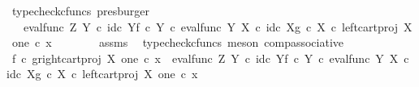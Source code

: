 \begin{isabellebody}
\ {\isacharparenleft}{\kern0pt}typecheck{\isacharunderscore}{\kern0pt}cfuncs{\isacharcomma}{\kern0pt}\ presburger{\isacharparenright}{\kern0pt}\isanewline
\ \ \ \ \isamarkupfalse%
\ \isamarkupfalse%
\ {\isachardoublequoteopen}{\isachardot}{\kern0pt}{\isachardot}{\kern0pt}{\isachardot}{\kern0pt}\ {\isacharequal}{\kern0pt}\ {\isacharparenleft}{\kern0pt}{\isacharparenleft}{\kern0pt}{\isacharparenleft}{\kern0pt}eval{\isacharunderscore}{\kern0pt}func\ Z\ Y\ {\isasymcirc}\isactrlsub c\ {\isasymlangle}id\isactrlsub c\ Y{\isacharcomma}{\kern0pt}f\ {\isasymcirc}\isactrlsub c\ {\isasymbeta}\isactrlbsub Y\isactrlesub {\isasymrangle}{\isacharparenright}{\kern0pt}\ {\isasymcirc}\isactrlsub c\ eval{\isacharunderscore}{\kern0pt}func\ Y\ X\ {\isasymcirc}\isactrlsub c\ {\isasymlangle}id\isactrlsub c\ X{\isacharcomma}{\kern0pt}g\ {\isasymcirc}\isactrlsub c\ {\isasymbeta}\isactrlbsub X\isactrlesub {\isasymrangle}{\isacharparenright}{\kern0pt}\ {\isasymcirc}\isactrlsub c\ left{\isacharunderscore}{\kern0pt}cart{\isacharunderscore}{\kern0pt}proj\ X\ one{\isacharparenright}{\kern0pt}\ {\isasymcirc}\isactrlsub c\ x{}{\isachardoublequoteclose}\isanewline
\ \ \ \ \ \ \isamarkupfalse%
\ assms\ \isamarkupfalse%
\ {\isacharparenleft}{\kern0pt}typecheck{\isacharunderscore}{\kern0pt}cfuncs{\isacharcomma}{\kern0pt}\ meson\ comp{\isacharunderscore}{\kern0pt}associative{}{\isacharparenright}{\kern0pt}\isanewline
\ \ \ \ \isamarkupfalse%
\ \isamarkupfalse%
\ {\isachardoublequoteopen}{\isacharparenleft}{\kern0pt}f\isactrlsup {\isasymflat}\ {\isasymcirc}\isactrlsub c\ {\isasymlangle}g\isactrlsup {\isasymflat}{\isacharcomma}{\kern0pt}right{\isacharunderscore}{\kern0pt}cart{\isacharunderscore}{\kern0pt}proj\ X\ one{\isasymrangle}{\isacharparenright}{\kern0pt}\ {\isasymcirc}\isactrlsub c\ x{}\ {\isacharequal}{\kern0pt}\ {\isacharparenleft}{\kern0pt}{\isacharparenleft}{\kern0pt}{\isacharparenleft}{\kern0pt}eval{\isacharunderscore}{\kern0pt}func\ Z\ Y\ {\isasymcirc}\isactrlsub c\ {\isasymlangle}id\isactrlsub c\ Y{\isacharcomma}{\kern0pt}f\ {\isasymcirc}\isactrlsub c\ {\isasymbeta}\isactrlbsub Y\isactrlesub {\isasymrangle}{\isacharparenright}{\kern0pt}\ {\isasymcirc}\isactrlsub c\ eval{\isacharunderscore}{\kern0pt}func\ Y\ X\ {\isasymcirc}\isactrlsub c\ {\isasymlangle}id\isactrlsub c\ X{\isacharcomma}{\kern0pt}g\ {\isasymcirc}\isactrlsub c\ {\isasymbeta}\isactrlbsub X\isactrlesub {\isasymrangle}{\isacharparenright}{\kern0pt}\ {\isasymcirc}\isactrlsub c\ left{\isacharunderscore}{\kern0pt}cart{\isacharunderscore}{\kern0pt}proj\ X\ one{\isacharparenright}{\kern0pt}\ {\isasymcirc}\isactrlsub c\ x{}{\isachardoublequoteclose}\isanewline

\end{isabellebody}
